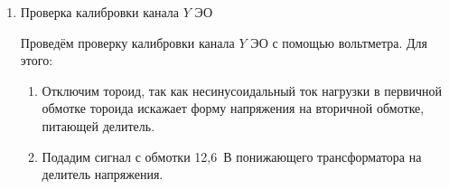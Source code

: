 \documentclass[a4paper]{article}
\begin{document}
\begin{enumerate}
\begin{enumerate}
    \item Закоротим обмотку $N_0$ образца, так как катушка с ферромагнитным сердечником является нелинейным элементом, и ток в ней не имеет синусоидальной формы. Поэтому связь между амплитудой тока и показаниями амперметра будет очень неточной при наличии образца.
    
    \item Подадим переменное напряжение на обмотку $N_0$, но поскольку она закорочена, ток в цепи станет синусоидальным, и его можно измерить точно.
    
    \item Измерим эффективное значение тока $I_{\mathrm{эф}}$ с помощью амперметра $A$, включённого последовательно с сопротивлением $R_0$.
    
    \item Снимем сигнал с сопротивления $R_0$ и подадим его на вход $X$ ЭО. Это напряжение пропорционально току: $U = I R_0$.
    
    \item На экране ЭО появится горизонтальная прямая, ширина которой соответствует удвоенной амплитуде напряжения на $R_0$.
    
    \item Измерим длину этой прямой $2x$ в делениях экрана.
    
    \item Рассчитаем чувствительность канала $X$ по формуле:
    \[
    K_X = \frac{2 R_0 \sqrt{2} I_{\mathrm{эф}}}{2x} \quad [\text{В/дел}].
    \]
    
    \item Сравним полученное значение $K_X$ с выбранным коэффициентом усиления канала $X$ на панели управления ЭО.
    
    \item Оценим погрешность измерений.
\end{enumerate}

\item Проверка калибровки канала $Y$ ЭО

Проведём проверку калибровки канала $Y$ ЭО с помощью вольтметра. Для этого:

\begin{enumerate}
    \item Отключим тороид, так как несинусоидальный ток нагрузки в первичной обмотке тороида искажает форму напряжения на вторичной обмотке, питающей делитель.
    
    \item Подадим сигнал с обмотки 12,6~В понижающего трансформатора на делитель напряжения.
    

\end{enumerate}
\end{enumerate}
\end{document}
